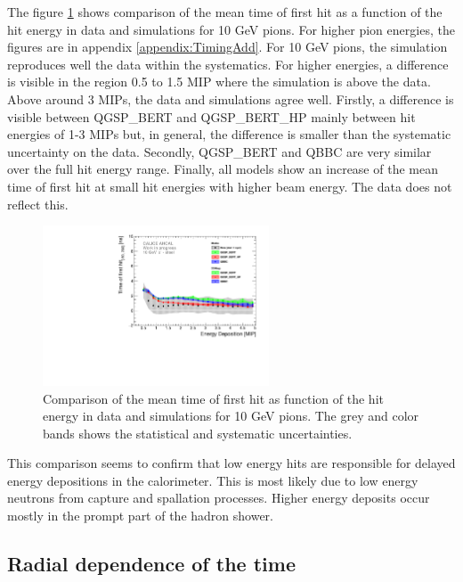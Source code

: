 The figure \ref{fig:Energy_SimData_10GeV} shows comparison of the mean time of first hit as a function of the hit energy in data and simulations for 10 GeV pions. For higher pion energies, the figures are in appendix \ref{appendix:TimingAdd}. For 10 GeV pions, the simulation reproduces well the data within the systematics. For higher energies, a difference is visible in the region 0.5 to 1.5 MIP where the simulation is above the data. Above around 3 MIPs, the data and simulations agree well. Firstly, a difference is visible between QGSP\_BERT and QGSP\_BERT\_HP mainly between hit energies of 1-3 MIPs but, in general, the difference is smaller than the systematic uncertainty on the data. Secondly, QGSP\_BERT and QBBC are very similar over the full hit energy range. Finally, all models show an increase of the mean time of first hit at small hit energies with higher beam energy. The data does not reflect this.

\begin{figure}[htbp!]
	\centering
	\includegraphics[width=0.6\textwidth]{../Thesis_Plots/Timing/Pions/Plots/ComparisonToSim/Time_Energy_10GeV.pdf}
	\caption{Comparison of the mean time of first hit as function of the hit energy in data and simulations for 10 GeV pions. The grey and color bands shows the statistical and systematic uncertainties.}
	\label{fig:Energy_SimData_10GeV}
\end{figure}

This comparison seems to confirm that low energy hits are responsible for delayed energy depositions in the calorimeter. This is most likely due to low energy neutrons from capture and spallation processes. Higher energy deposits occur mostly in the prompt part of the hadron shower.

\subsection{Radial dependence of the time}


